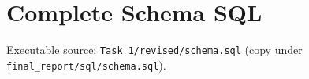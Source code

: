 \section{Complete Schema SQL}
\label{app:schema}

Executable source: \texttt{Task 1/revised/schema.sql} (copy under \texttt{final\_report/sql/schema.sql}).


